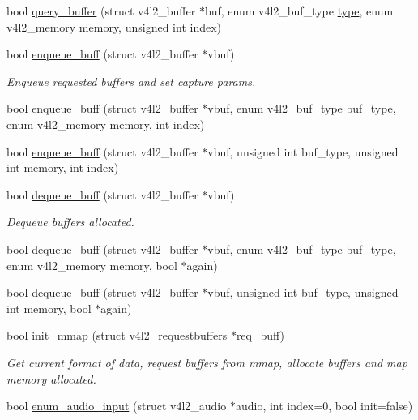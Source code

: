 \begin{DoxyCompactItemize}
bool \hyperlink{classv4lcap_a6e853d36a5e4c7959f36cc0669389c4a}{query\+\_\+buffer} (struct v4l2\+\_\+buffer $\ast$buf, enum v4l2\+\_\+buf\+\_\+type \hyperlink{classstd_1_1conditional_1_1type}{type}, enum v4l2\+\_\+memory memory, unsigned int index)
\item 
bool \hyperlink{classv4lcap_a61dcacb5bb57a9f8c72d6942f46e9ddc}{enqueue\+\_\+buff} (struct v4l2\+\_\+buffer $\ast$vbuf)
\begin{DoxyCompactList}\small\item\em Enqueue requested buffers and set capture params. \end{DoxyCompactList}\item 
bool \hyperlink{classv4lcap_acf3b811bf1d1db9842fef40e930813d7}{enqueue\+\_\+buff} (struct v4l2\+\_\+buffer $\ast$vbuf, enum v4l2\+\_\+buf\+\_\+type buf\+\_\+type, enum v4l2\+\_\+memory memory, int index)
\item 
bool \hyperlink{classv4lcap_a8a93dd2fbae2c781d2dde65433198cff}{enqueue\+\_\+buff} (struct v4l2\+\_\+buffer $\ast$vbuf, unsigned int buf\+\_\+type, unsigned int memory, int index)
\item 
bool \hyperlink{classv4lcap_a73678c131c1ac6c555be3ea125be08da}{dequeue\+\_\+buff} (struct v4l2\+\_\+buffer $\ast$vbuf)
\begin{DoxyCompactList}\small\item\em Dequeue buffers allocated. \end{DoxyCompactList}\item 
bool \hyperlink{classv4lcap_aeb01cf9f6ded716a28f23e0be13d7ca5}{dequeue\+\_\+buff} (struct v4l2\+\_\+buffer $\ast$vbuf, enum v4l2\+\_\+buf\+\_\+type buf\+\_\+type, enum v4l2\+\_\+memory memory, bool $\ast$again)
\item 
bool \hyperlink{classv4lcap_a8968da9e151ee6048cb179e62d3b088f}{dequeue\+\_\+buff} (struct v4l2\+\_\+buffer $\ast$vbuf, unsigned int buf\+\_\+type, unsigned int memory, bool $\ast$again)
\item 
bool \hyperlink{classv4lcap_adc14ff929732ccd31b790bc118cfd06a}{init\+\_\+mmap} (struct v4l2\+\_\+requestbuffers $\ast$req\+\_\+buff)
\begin{DoxyCompactList}\small\item\em Get current format of data, request buffers from mmap, allocate buffers and map memory allocated. \end{DoxyCompactList}\item 
bool \hyperlink{classv4lcap_a717dc56b523519e90853137346b6f7f7}{enum\+\_\+audio\+\_\+input} (struct v4l2\+\_\+audio $\ast$audio, int index=0, bool init=false)

\end{DoxyCompactItemize}
